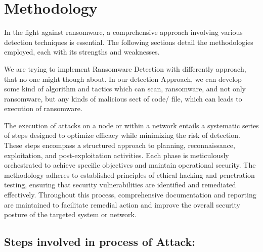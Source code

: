 \documentclass[12pt,twocolumn]{article}
\begin{document}
%
\vspace*{0.5 cm}

\section{Methodology}

In the fight against ransomware, a comprehensive approach involving various detection techniques is essential. The following sections detail the methodologies employed, each with its strengths and weaknesses.

We are trying to implement Ransomware Detection with differently approach, that no one might though about. In our detection Approach, we can develop some kind of algorithm and tactics which can scan, ransomware, and not only ransomware, but any kinds of malicious sect of code/ file, which can leads to execution of ransomware. \cite{AKBANOV2019111}

The execution of attacks on a node or within a network entails a systematic series of steps designed to optimize efficacy while minimizing the risk of detection. These steps encompass a structured approach to planning, reconnaissance, exploitation, and post-exploitation activities. Each phase is meticulously orchestrated to achieve specific objectives and maintain operational security. The methodology adheres to established principles of ethical hacking and penetration testing, ensuring that security vulnerabilities are identified and remediated effectively. Throughout this process, comprehensive documentation and reporting are maintained to facilitate remedial action and improve the overall security posture of the targeted system or network.

\subsection{Steps involved in process of Attack:}
\end{document}
